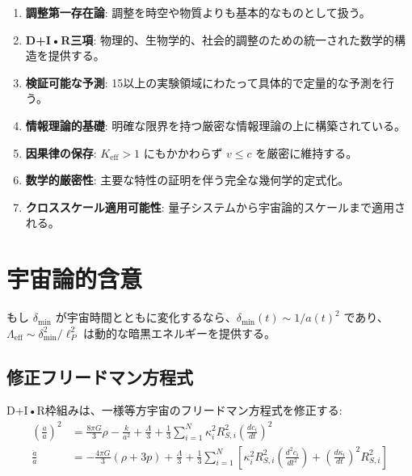 \documentclass[11pt,a4paper]{article}
\begin{document}
	\begin{enumerate}
		\item \textbf{調整第一存在論}: 調整を時空や物質よりも基本的なものとして扱う。
		
		\item \textbf{D+I•R三項}: 物理的、生物学的、社会的調整のための統一された数学的構造を提供する。
		
		\item \textbf{検証可能な予測}: 15以上の実験領域にわたって具体的で定量的な予測を行う。
		
		\item \textbf{情報理論的基礎}: 明確な限界を持つ厳密な情報理論の上に構築されている。
		
		\item \textbf{因果律の保存}: $K_{\mathrm{eff}} > 1$ にもかかわらず $v \leq c$ を厳密に維持する。
		
		\item \textbf{数学的厳密性}: 主要な特性の証明を伴う完全な幾何学的定式化。
		
		\item \textbf{クロススケール適用可能性}: 量子システムから宇宙論的スケールまで適用される。
	\end{enumerate}
	
	\section{宇宙論的含意}
	もし $\delta_{\min}$ が宇宙時間とともに変化するなら、$\delta_{\min}(t) \sim 1/a(t)^2$ であり、$\Lambda_{\text{eff}} \sim \delta_{\min}^2/\ell_P^2$ は動的な暗黒エネルギーを提供する。
	
	\subsection{修正フリードマン方程式}
	
	D+I•R枠組みは、一様等方宇宙のフリードマン方程式を修正する:
	\begin{align}
		\left(\frac{\dot{a}}{a}\right)^2 &= \frac{8\pi G}{3}\rho - \frac{k}{a^2} + \frac{\Lambda}{3} + \frac{1}{3}\sum_{i=1}^N \kappa_i^2 R_{S,i}^2 \left(\frac{dc_i}{dt}\right)^2 \\
		\frac{\ddot{a}}{a} &= -\frac{4\pi G}{3}(\rho + 3p) + \frac{\Lambda}{3} + \frac{1}{3}\sum_{i=1}^N \left[ \kappa_i^2 R_{S,i}^2 \left(\frac{d^2c_i}{dt^2}\right) + \left(\frac{d\kappa_i}{dt}\right)^2 R_{S,i}^2 \right]
	\end{align}
	
\end{document}
